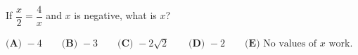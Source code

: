 If $\dfrac x2=\dfrac4x$ and $x$ is negative, what is $x$?

$\textbf{(A) }-4\qquad\textbf{(B) }-3\qquad\textbf{(C) }-2\sqrt2\qquad\textbf{(D) }-2\qquad\textbf{(E) }\text{No values of }x\text{ work.}$

